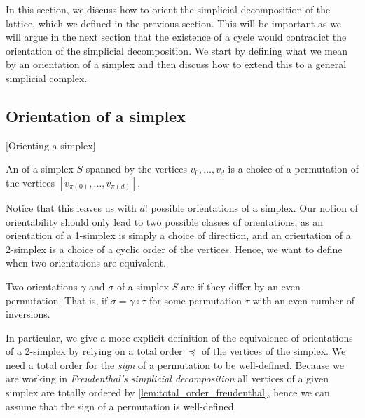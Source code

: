 In this section, we discuss how to orient the simplicial decomposition of the lattice, which we defined in the previous section. This will be important as we will argue in the next section that the existence of a cycle would contradict the orientation of the simplicial decomposition. We start by defining what we mean by an orientation of a simplex and then discuss how to extend this to a general simplicial complex.

\subsection{Orientation of a simplex}[Orienting a simplex]\label{sec:orientation_of_simplex}

\begin{definition}
	An  of a simplex $S$ spanned by the vertices $v_0, \dots, v_d$ is a choice of a permutation of the vertices $[v_{\pi(0)}, \dots, v_{\pi(d)}]$.
\end{definition}

Notice that this leaves us with ${d!}$ possible orientations of a simplex. Our notion of orientability should only lead to two possible classes of orientations, as an orientation of a 1-simplex is simply a choice of direction, and an orientation of a 2-simplex is a choice of a cyclic order of the vertices. Hence, we want to define when two orientations are equivalent.

\begin{definition}
	Two orientations $\gamma$ and $\sigma$ of a simplex $S$ are  if they differ by an even permutation. That is, if $\sigma = \gamma \circ \tau$ for some permutation $\tau$ with an even number of inversions.
\end{definition}

In particular, we give a more explicit definition of the equivalence of orientations of a 2-simplex by relying on a total order $\preceq$ of the vertices of the simplex. We need a total order for the \emph{sign} of a permutation to be well-defined. Because we are working in \emph{Freudenthal's simplicial decomposition} all vertices of a given simplex are totally ordered by \cref{lem:total_order_freudenthal}, hence we can assume that the sign of a permutation is well-defined.

